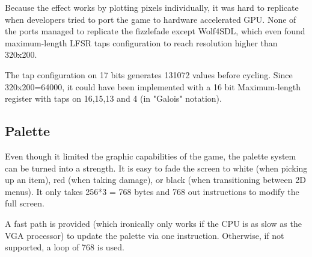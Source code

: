  Because the effect works by plotting pixels individually, it was hard to replicate when developers tried to port the game to hardware accelerated GPU. None of the ports managed to replicate the fizzlefade except Wolf4SDL, which even found maximum-length LFSR taps configuration to reach resolution higher than 320x200.\\
\par
{} The tap configuration on 17 bits generates 131072 values before cycling. Since 320x200=64000, it could have been implemented with a 16 bit Maximum-length register with taps on 16,15,13 and 4 (in "Galois" notation).










\subsection{Palette}
Even though it limited the graphic capabilities of the game, the palette system can be turned into a strength. It is easy to fade the screen to white (when picking up an item), red (when taking damage), or black (when transitioning between 2D menus). It only takes 256*3 = 768 bytes and 768 out instructions to modify the full screen.\\
\par

 \hspace{20pt}\par
 \vspace{10pt}
 \hspace{20pt}\par
 \vspace{10pt}
 \hspace{20pt}\par
\pagebreak

A fast path is provided (which ironically only works if the CPU is as slow as the VGA processor) to update the palette via one  instruction. Otherwise, if not supported, a loop of 768  is used.\\
\par
\begin{minipage}{\linewidth}

\end{minipage}








